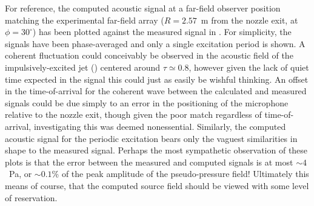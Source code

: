 For reference, the computed acoustic signal at a far-field observer position matching the experimental far-field array ($R = 2.57$~m from the nozzle exit, at $\phi = 30^\circ$) has been plotted against the measured signal in .
For simplicity, the signals have been phase-averaged and only a single excitation period is shown.
A coherent fluctuation could conceivably be observed in the acoustic field of the impulsively-excited jet () centered around $\tau \simeq 0.8$, however given the lack of quiet time expected in the signal this could just as easily be wishful thinking.
An offset in the time-of-arrival for the coherent wave between the calculated and measured signals could be due simply to an error in the positioning of the microphone relative to the nozzle exit, though given the poor match regardless of time-of-arrival, investigating this was deemed nonessential.
Similarly, the computed acoustic signal for the periodic excitation bears only the vaguest similarities in shape to the measured signal.
Perhaps the most sympathetic observation of these plots is that the error between the measured and computed signals is at most $\sim 4$~Pa, or $\sim 0.1$\% of the peak amplitude of the pseudo-pressure field!
Ultimately this means of course, that the computed source field should be viewed with some level of reservation.
